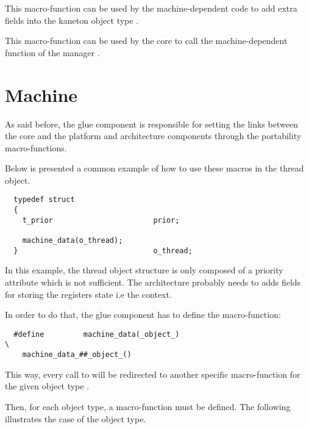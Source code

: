 	 {
	   This macro-function can be used by the machine-dependent code
	   to add extra fields into the kaneton object type .
	 }

	 {
	   This macro-function can be used by the core to call the
	   machine-dependent function  of the manager
	   .
	 }

%
%

\section{Machine}

As said before, the glue component is responsible for setting the links between
the core and the platform and architecture components through the portability
macro-functions.

Below is presented a common example of how to use these macros in the
thread object.

\begin{verbatim}
  typedef struct
  {
    t_prior                       prior;

    machine_data(o_thread);
  }                               o_thread;
\end{verbatim}

In this example, the thread object structure is only composed of a priority
attribute which is not sufficient. The architecture probably needs to
adds fields for storing the registers state i.e the context.

In order to do that, the glue component has to define the
 macro-function:

\begin{verbatim}
  #define         machine_data(_object_)                                  \
    machine_data_##_object_()
\end{verbatim}

This way, every call to  will be redirected to another
specific macro-function for the given object type \ie{} .

Then, for each object type, a macro-function must be defined. The following
illustrates the case of the \code{o\_thread} object type.

